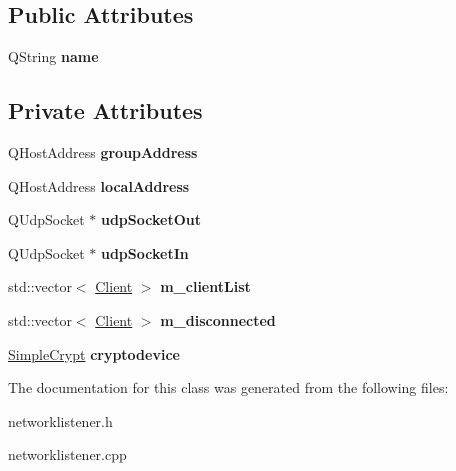 \subsection*{Public Attributes}
\begin{DoxyCompactItemize}
\item 
\hypertarget{class_network_listener_af0f6d8c5a2b1b2c457e1e4ee68e1d4bf}{}Q\+String {\bfseries name}\label{class_network_listener_af0f6d8c5a2b1b2c457e1e4ee68e1d4bf}

\end{DoxyCompactItemize}
\subsection*{Private Attributes}
\begin{DoxyCompactItemize}
\item 
\hypertarget{class_network_listener_a4283b85857436ac617eeb4c93fdf11ac}{}Q\+Host\+Address {\bfseries group\+Address}\label{class_network_listener_a4283b85857436ac617eeb4c93fdf11ac}

\item 
\hypertarget{class_network_listener_a9941fd48019abc42514df6b204228b74}{}Q\+Host\+Address {\bfseries local\+Address}\label{class_network_listener_a9941fd48019abc42514df6b204228b74}

\item 
\hypertarget{class_network_listener_adaba275a4d4b8bd16506f13f95b1575a}{}Q\+Udp\+Socket $\ast$ {\bfseries udp\+Socket\+Out}\label{class_network_listener_adaba275a4d4b8bd16506f13f95b1575a}

\item 
\hypertarget{class_network_listener_a5209ce2c1fcde559cd7bb499582bc31c}{}Q\+Udp\+Socket $\ast$ {\bfseries udp\+Socket\+In}\label{class_network_listener_a5209ce2c1fcde559cd7bb499582bc31c}

\item 
\hypertarget{class_network_listener_ad9e784d4d6f035ecc02d4b47368e727f}{}std\+::vector$<$ \hyperlink{struct_client}{Client} $>$ {\bfseries m\+\_\+client\+List}\label{class_network_listener_ad9e784d4d6f035ecc02d4b47368e727f}

\item 
\hypertarget{class_network_listener_aa22cfac015aabb913b1e91410a57c7c8}{}std\+::vector$<$ \hyperlink{struct_client}{Client} $>$ {\bfseries m\+\_\+disconnected}\label{class_network_listener_aa22cfac015aabb913b1e91410a57c7c8}

\item 
\hypertarget{class_network_listener_adb41464b0923c725f94001b73e51a820}{}\hyperlink{class_simple_crypt}{Simple\+Crypt} {\bfseries cryptodevice}\label{class_network_listener_adb41464b0923c725f94001b73e51a820}

\end{DoxyCompactItemize}


The documentation for this class was generated from the following files\+:\begin{DoxyCompactItemize}
\item 
networklistener.\+h\item 
networklistener.\+cpp\end{DoxyCompactItemize}
